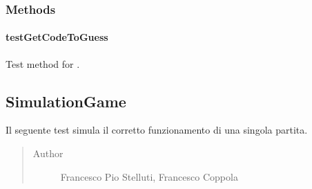 \documentclass[letterpaper,10pt,italian,openany,oneside]{sphinxmanual}
\begin{document}
\subsubsection{Methods}
\label{\detokenize{test/it/unicam/cs/pa/mastermind/test/PlayersRandomBotMakerTest:methods}}

\paragraph{testGetCodeToGuess}
\label{\detokenize{test/it/unicam/cs/pa/mastermind/test/PlayersRandomBotMakerTest:testgetcodetoguess}}

\begin{fulllineitems}
\label{\detokenize{test/it/unicam/cs/pa/mastermind/test/PlayersRandomBotMakerTest:it.unicam.cs.pa.mastermind.test.PlayersRandomBotMakerTest.testGetCodeToGuess()}}
Test method for .

\end{fulllineitems}



\subsection{SimulationGame}
\label{\detokenize{test/it/unicam/cs/pa/mastermind/test/SimulationGame:simulationgame}}\label{\detokenize{test/it/unicam/cs/pa/mastermind/test/SimulationGame::doc}}

\begin{fulllineitems}
\label{\detokenize{test/it/unicam/cs/pa/mastermind/test/SimulationGame:it.unicam.cs.pa.mastermind.test.SimulationGame}}
Il seguente test simula il corretto funzionamento di una singola partita.
\begin{quote}\begin{description}
\item[{Author}] \leavevmode
Francesco Pio Stelluti, Francesco Coppola

\end{description}\end{quote}

\end{fulllineitems}
\end{document}
